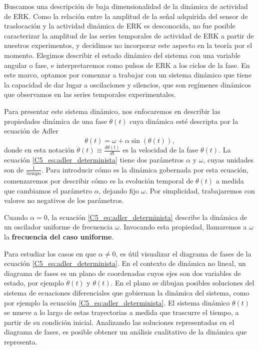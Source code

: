 \documentclass[./main.tex]{subfiles}
\begin{document}
Buscamos una descripción de baja dimensionalidad de la dinámica de actividad de ERK. Como la relación entre la amplitud de la señal adquirida del sensor de traslocación y la actividad dinámica de ERK es desconocida, no fue posible caracterizar la amplitud de las series temporales de actividad de ERK a partir de nuestros experimentos, y decidimos no incorporar este aspecto en la teoría por el momento. Elegimos describir el estado dinámico del sistema con una variable angular o fase, e interpretaremos como pulsos de ERK a los ciclos de la fase. En este marco, optamos por comenzar a trabajar con un sistema dinámico que tiene la capacidad de dar lugar a oscilaciones y silencios, que son regímenes dinámicos que observamos en las series temporales experimentales. 

Para presentar este sistema dinámico, nos enfocaremos en describir las propiedades dinámica de una fase $\theta(t)$ cuya dinámica esté descripta por la ecuación de Adler \cite{Strogatz1994}
\begin{equation}
    \dot{\theta}(t) = \omega + \alpha \sin{(\theta(t))},
    \label{C5_eq:adler_determinista}
\end{equation}
donde en esta notación $\dot{\theta}(t) \equiv \frac{d\theta(t)}{dt}$ es la velocidad de la fase $\theta(t)$. La ecuación \ref{C5_eq:adler_determinista} tiene dos parámetros $\alpha$ y $\omega$, cuyas unidades son de $\frac{1}{\text{tiempo}}$. Para introducir cómo es la dinámica gobernada por esta ecuación, comenzaremos por describir cómo es la evolución temporal de $\theta(t)$ a medida que cambiamos el parámetro $\alpha$, dejando fijo $\omega$. Por simplicidad, trabajaremos con valores no negativos de los parámetros.

Cuando $\alpha = 0$, la ecuación \ref{C5_eq:adler_determinista} describe la dinámica de un oscilador uniforme de frecuencia $\omega$. Invocando esta propiedad, llamaremos a $\omega$ la \textbf{frecuencia del caso uniforme}. 


Para estudiar los casos en que $\alpha \neq 0$, es útil visualizar el diagrama de fases de la ecuación \ref{C5_eq:adler_determinista}. En el contexto de dinámica no lineal, un diagrama de fases es un plano de coordenadas cuyos ejes son dos variables de estado, por ejemplo $\dot{\theta}(t) $ y $\theta(t)$. En el plano se dibujan posibles soluciones del sistema de ecuaciones diferenciales que gobiernan la dinámica del sistema, como por ejemplo la ecuación \ref{C5_eq:adler_determinista}. El sistema dinámico $\theta(t)$ se mueve a lo largo de estas trayectorias a medida que trascurre el tiempo, a partir de su condición inicial. Analizando las soluciones representadas en el diagrama de fases, es posible obtener un análisis cualitativo de la dinámica que representa.
\end{document}
